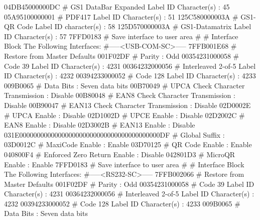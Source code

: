 04DB45000000DC                 # GS1 DataBar Expanded Label ID Character(s) :         45
05A95100000001                 # PDF417 Label ID Character(s)             :         51
125C580000003A                 # GS1-QR Code Label ID character(s)        :         58
125D570000003A                 # GS1-Datamatrix Label ID Character(s)     :         57
7FFD0183                       # Save interface to user area
#
# Interface Block The Following Interfaces:
#-----<USB-COM-SC>-----
7FFB001E68                     # Restore from Master Defaults
001F02DF                       # Parity                                   :        Odd
00354231000058                 # Code 39 Label ID Character(s)            :       4231
00364232000056                 # Interleaved 2-of-5 Label ID Character(s) :       4232
00394233000052                 # Code 128 Label ID Character(s)           :       4233
009B0065                       # Data Bits                                : Seven data bits
00B70049                       # UPCA Check Character Transmission        :    Disable
00B80048                       # EAN8 Check Character Transmission        :    Disable
00B90047                       # EAN13 Check Character Transmission       :    Disable
02D0002E                       # UPCA Enable                              :    Disable
02D1002D                       # UPCE Enable                              :    Disable
02D2002C                       # EAN8 Enable                              :    Disable
02D3002B                       # EAN13 Enable                             :    Disable
031E0000000000000000000000000000000000000000DF # Global Suffix                            :           
03D0012C                       # MaxiCode Enable                          :     Enable
03D70125                       # QR Code Enable                           :     Enable
040800F4                       # Enforced Zero Return Enable              :    Disable
042801D3                       # MicroQR Enable                           :     Enable
7FFD0183                       # Save interface to user area
#
# Interface Block The Following Interfaces:
#-----<RS232-SC>-----
7FFB002066                     # Restore from Master Defaults
001F02DF                       # Parity                                   :        Odd
00354231000058                 # Code 39 Label ID Character(s)            :       4231
00364232000056                 # Interleaved 2-of-5 Label ID Character(s) :       4232
00394233000052                 # Code 128 Label ID Character(s)           :       4233
009B0065                       # Data Bits                                : Seven data bits
